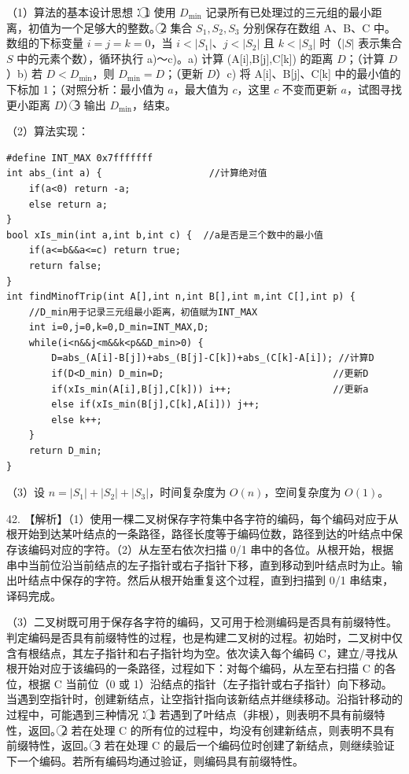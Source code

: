 \documentclass[UTF8,11pt]{ctexart}
\begin{document}
（1）算法的基本设计思想：\textcircled{1} 使用 \(\displaystyle D_{\displaystyle \min}\) 记录所有已处理过的三元组的最小距离，初值为一个足够大的整数。\textcircled{2} 集合 \(\displaystyle S_1,\allowbreak S_2,\allowbreak S_3\) 分别保存在数组 A、B、C 中。数组的下标变量 \(\displaystyle i=j=k=0\)，当 \(\displaystyle i<|S_1|\)、\(\displaystyle j<|S_2|\) 且 \(\displaystyle k<|S_3|\) 时（\(\displaystyle |S|\) 表示集合 \(\displaystyle S\) 中的元素个数），循环执行 a)～c)。a) 计算 (A[i],B[j],C[k]) 的距离 \(\displaystyle D\)；（计算 \(\displaystyle D\)）b) 若 \(\displaystyle D<D_{\displaystyle \min}\)，则 \(\displaystyle D_{\displaystyle \min}=D\)；（更新 \(\displaystyle D\)）c) 将 A[i]、B[j]、C[k] 中的最小值的下标加 1；（对照分析：最小值为 \(\displaystyle a\)，最大值为 \(\displaystyle c\)，这里 \(\displaystyle c\) 不变而更新 \(\displaystyle a\)，试图寻找更小距离 \(\displaystyle D\)）\textcircled{3} 输出 \(\displaystyle D_{\displaystyle \min}\)，结束。


（2）算法实现：


\begin{Verbatim}[breaklines,breakanywhere,fontsize=\small]
#define INT_MAX 0x7fffffff
int abs_(int a) {                   //计算绝对值
    if(a<0) return -a;
    else return a;
}
bool xIs_min(int a,int b,int c) {  //a是否是三个数中的最小值
    if(a<=b&&a<=c) return true;
    return false;
}
int findMinofTrip(int A[],int n,int B[],int m,int C[],int p) {
    //D_min用于记录三元组最小距离，初值赋为INT_MAX
    int i=0,j=0,k=0,D_min=INT_MAX,D;
    while(i<n&&j<m&&k<p&&D_min>0) {
        D=abs_(A[i]-B[j])+abs_(B[j]-C[k])+abs_(C[k]-A[i]); //计算D
        if(D<D_min) D_min=D;                              //更新D
        if(xIs_min(A[i],B[j],C[k])) i++;                  //更新a
        else if(xIs_min(B[j],C[k],A[i])) j++;
        else k++;
    }
    return D_min;
}
\end{Verbatim}

（3）设 \(\displaystyle n=|S_1|+|S_2|+|S_3|\)，时间复杂度为 \(\displaystyle O(n)\)，空间复杂度为 \(\displaystyle O(1)\)。


42. 【解析】（1）使用一棵二叉树保存字符集中各字符的编码，每个编码对应于从根开始到达某叶结点的一条路径，路径长度等于编码位数，路径到达的叶结点中保存该编码对应的字符。（2）从左至右依次扫描 0/1 串中的各位。从根开始，根据串中当前位沿当前结点的左子指针或右子指针下移，直到移动到叶结点时为止。输出叶结点中保存的字符。然后从根开始重复这个过程，直到扫描到 0/1 串结束，译码完成。


（3）二叉树既可用于保存各字符的编码，又可用于检测编码是否具有前缀特性。判定编码是否具有前缀特性的过程，也是构建二叉树的过程。初始时，二叉树中仅含有根结点，其左子指针和右子指针均为空。依次读入每个编码 C，建立/寻找从根开始对应于该编码的一条路径，过程如下：对每个编码，从左至右扫描 C 的各位，根据 C 当前位（0 或 1）沿结点的指针（左子指针或右子指针）向下移动。当遇到空指针时，创建新结点，让空指针指向该新结点并继续移动。沿指针移动的过程中，可能遇到三种情况：\textcircled{1} 若遇到了叶结点（非根），则表明不具有前缀特性，返回。\textcircled{2} 若在处理 C 的所有位的过程中，均没有创建新结点，则表明不具有前缀特性，返回。\textcircled{3} 若在处理 C 的最后一个编码位时创建了新结点，则继续验证下一个编码。若所有编码均通过验证，则编码具有前缀特性。
\end{document}
